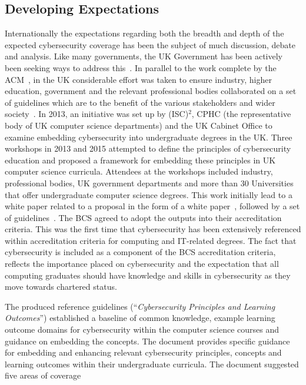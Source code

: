 \documentclass[conference]{IEEEtran}
\begin{document}
\subsection{Developing Expectations}

Internationally the expectations regarding both the breadth and depth of the expected cybersecurity coverage has been the subject of much discussion, debate and analysis. Like many governments, the UK Government has been actively been seeking ways to address this~\cite{UKCabinetOffice2014,ukcyberstrategy:2016}. In parallel to the work complete by the ACM~\cite{ACM2013a}, in the UK considerable effort was taken to ensure industry, higher education, government and the relevant professional bodies collaborated on a set of guidelines which are to the benefit of the various stakeholders and wider society~\cite{Irons2016}. In 2013, an initiative was set up by (ISC)$^2$, CPHC (the representative body of UK computer science departments) and the UK Cabinet Office to examine embedding cybersecurity into undergraduate degrees in the UK. Three workshops in 2013 and 2015 attempted to define the principles of cybersecurity education and proposed a framework for embedding these principles in UK computer science curricula. Attendees at the workshops included industry, professional bodies, UK government departments and more than 30 Universities that offer undergraduate computer science degrees. This work initially lead to a white paper related to a proposal in the form of a white paper~\cite{CPHCISC2014}, followed by a set of guidelines~\cite{CPHCISC2}. The BCS agreed to adopt the outputs into their accreditation criteria. This was the first time that cybersecurity has been extensively referenced within accreditation criteria for computing and IT-related degrees. The fact that cybersecurity is included as a component of the BCS accreditation criteria, reflects the importance placed on cybersecurity and the expectation that all computing graduates should have knowledge and skills in cybersecurity as they move towards chartered status.

The produced reference guidelines (``{\emph{Cybersecurity Principles and Learning Outcomes}}'') \cite{CPHCISC2} established a baseline of common knowledge, example learning outcome domains for cybersecurity within the computer science courses and guidance on embedding the concepts. The document provides specific guidance for embedding and enhancing relevant cybersecurity principles, concepts and learning outcomes within their undergraduate curricula. The document suggested five areas of coverage 
\end{document}
